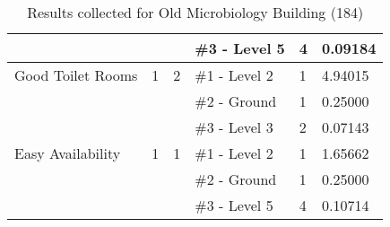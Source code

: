 \begin{table}[H]
{\begin{tabular}{|l|l|l|l|l|l|}
                    &                            &                                     & \#3   - Level 5 & 4             & 0.09184         \\ \hline
Good   Toilet Rooms & 1                          & 2                                   & \#1   - Level 2 & 1             & 4.94015         \\ \hline
                    &                            &                                     & \#2   - Ground  & 1             & 0.25000         \\ \hline
                    &                            &                                     & \#3   - Level 3 & 2             & 0.07143         \\ \hline
Easy   Availability & 1                          & 1                                   & \#1   - Level 2 & 1             & 1.65662         \\ \hline
                    &                            &                                     & \#2   - Ground  & 1             & 0.25000         \\ \hline
                    &                            &                                     & \#3   - Level 5 & 4             & 0.10714         \\ \hline
\end{tabular}
}
\caption{Results collected for Old Microbiology Building (184)}
\label{appendix:oldmicro_floor_to}
\end{table}


